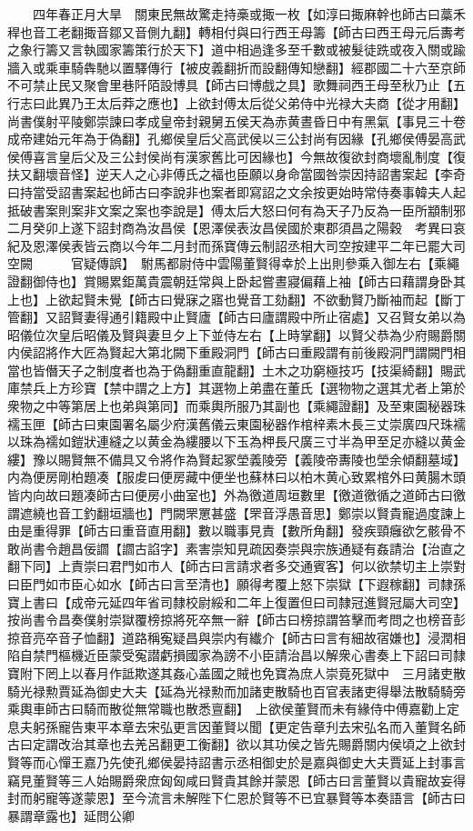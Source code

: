 　　四年春正月大旱　關東民無故驚走持槀或掫一枚【如淳曰掫麻幹也師古曰藁禾稈也音工老翻掫音鄒又音側九翻】轉相付與曰行西王母籌【師古曰西王母元后夀考之象行籌又言執國家籌策行於天下】道中相過逢多至千數或被髮徒跣或夜入關或踰牆入或乘車騎犇馳以置驛傳行【被皮義翻折而設翻傳知戀翻】經郡國二十六至京師不可禁止民又聚會里巷阡陌設博具【師古曰博戲之具】歌舞祠西王母至秋乃止【五行志曰此異乃王太后莽之應也】上欲封傅太后從父弟侍中光禄大夫商【從才用翻】尚書僕射平陵鄭崇諫曰孝成皇帝封親舅五侯天為赤黄晝昏日中有黑氣【事見三十卷成帝建始元年為于偽翻】孔鄉侯皇后父高武侯以三公封尚有因緣【孔鄉侯傅晏高武侯傅喜言皇后父及三公封侯尚有漢家舊比可因緣也】今無故復欲封商壞亂制度【復扶又翻壞音怪】逆天人之心非傅氏之福也臣願以身命當國咎崇因持詔書案起【李奇曰持當受詔書案起也師古曰李說非也案者即寫詔之文余按更始時常侍奏事韓夫人起抵破書案則案非文案之案也李說是】傅太后大怒曰何有為天子乃反為一臣所顓制邪二月癸卯上遂下詔封商為汝昌侯【恩澤侯表汝昌侯國於東郡須昌之陽穀　考異曰哀紀及恩澤侯表皆云商以今年二月封而孫寶傳云制詔丞相大司空按建平二年已罷大司空闕　　　官疑傳誤】　駙馬都尉侍中雲陽董賢得幸於上出則參乘入御左右【乘繩證翻御侍也】賞賜累鉅萬貴震朝廷常與上卧起嘗晝寢偏藉上袖【師古曰藉謂身卧其上也】上欲起賢未覺【師古曰覺寐之寤也覺音工劾翻】不欲動賢乃斷袖而起【斷丁管翻】又詔賢妻得通引籍殿中止賢廬【師古曰廬謂殿中所止宿處】又召賢女弟以為昭儀位次皇后昭儀及賢與妻旦夕上下並侍左右【上時掌翻】以賢父恭為少府賜爵關内侯詔將作大匠為賢起大第北闕下重殿洞門【師古曰重殿謂有前後殿洞門謂闕門相當也皆僭天子之制度者也為于偽翻重直龍翻】土木之功窮極技巧【技渠綺翻】賜武庫禁兵上方珍寶【禁中謂之上方】其選物上弟盡在董氏【選物物之選其尤者上第於衆物之中等第居上也弟與第同】而乘輿所服乃其副也【乘繩證翻】及至東園秘器珠襦玉匣【師古曰東園署名屬少府漢舊儀云東園秘器作棺梓素木長三丈崇廣四尺珠襦以珠為襦如鎧狀連縫之以黄金為縷腰以下玉為柙長尺廣三寸半為甲至足亦縫以黄金縷】豫以賜賢無不備具又令將作為賢起冢塋義陵旁【義陵帝夀陵也塋余傾翻墓域】内為便房剛柏題凑【服䖍曰便房藏中便坐也蘇林曰以柏木黄心致累棺外曰黄腸木頭皆内向故曰題凑師古曰便房小曲室也】外為徼道周垣數里【徼道徼循之道師古曰徼謂遮繞也音工釣翻垣牆也】門闕罘罳甚盛【罘音浮愚音思】鄭崇以賢貴寵過度諫上由是重得罪【師古曰重音直用翻】數以職事見責【數所角翻】發疾頸癰欲乞骸骨不敢尚書令趙昌佞讇【讇古諂字】素害崇知見疏因奏崇與宗族通疑有姦請治【治直之翻下同】上責崇曰君門如市人【師古曰言請求者多交通賓客】何以欲禁切主上崇對曰臣門如市臣心如水【師古曰言至清也】願得考覆上怒下崇獄【下遐稼翻】司隸孫寶上書曰【成帝元延四年省司隸校尉綏和二年上復置但曰司隸冠進賢冠屬大司空】按尚書令昌奏僕射崇獄覆榜掠將死卒無一辭【師古曰榜掠謂笞擊而考問之也榜音彭掠音亮卒音子恤翻】道路稱寃疑昌與崇内有纎介【師古曰言有細故宿嫌也】浸潤相陷自禁門樞機近臣蒙受寃譛虧損國家為謗不小臣請治昌以解衆心書奏上下詔曰司隸寶附下罔上以春月作詆欺遂其姦心盖國之賊也免寶為庶人崇竟死獄中　三月諸吏散騎光禄勲賈延為御史大夫【延為光禄勲而加諸吏散騎也百官表諸吏得舉法散騎騎旁乘輿車師古曰騎而散從無常職也散悉亶翻】　上欲侯董賢而未有緣侍中傅嘉勸上定息夫躬孫寵告東平本章去宋弘更言因董賢以聞【更定告章刋去宋弘名而入董賢名師古曰定謂改治其章也去羌呂翻更工衡翻】欲以其功侯之皆先賜爵關内侯頃之上欲封賢等而心憚王嘉乃先使孔鄉侯晏持詔書示丞相御史於是嘉與御史大夫賈延上封事言竊見董賢等三人始賜爵衆庶匈匈咸曰賢貴其餘并蒙恩【師古曰言董賢以貴寵故妄得封而躬寵等遂蒙恩】至今流言未解陛下仁恩於賢等不已宜暴賢等本奏語言【師古曰暴謂章露也】延問公卿